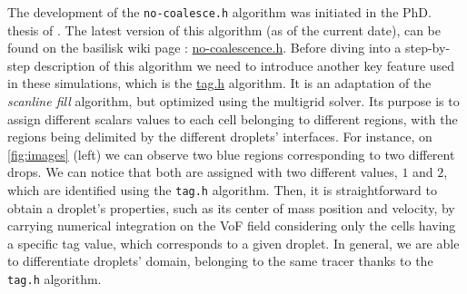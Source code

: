 The development of the \texttt{no-coalesce.h} algorithm was initiated in the PhD. thesis of \citet{mani2021numerical}.
The latest version of this algorithm (as of the current date), can be found on the basilisk wiki page : \href{http://basilisk.fr/sandbox/fintzin/Rising-Suspenion/no-coalescence.h}{no-coalescence.h}.
Before  diving into a step-by-step description of this algorithm we need to introduce another key feature used in these simulations, which is the \href{http://basilisk.fr/src/tag.h}{tag.h} algorithm. 
It is an adaptation of the \textit{scanline fill} algorithm, but optimized using the multigrid solver. 
Its purpose is to assign different scalars values to each cell belonging to different regions, with the regions being delimited by the different droplets' interfaces. 
For instance, on \ref{fig:images} (left) we can observe two blue regions corresponding to two different drops.
We can notice that both are assigned with two different values, $1$ and $2$, which are identified using the \texttt{tag.h} algorithm. 
Then, it is straightforward to obtain a droplet's properties, such as its center of mass position and velocity, by carrying numerical integration on the VoF field considering only the cells having a specific tag value, which corresponds to a given droplet.  
In general, we are able to differentiate droplets' domain, belonging to the same tracer thanks to the \texttt{tag.h} algorithm. 

